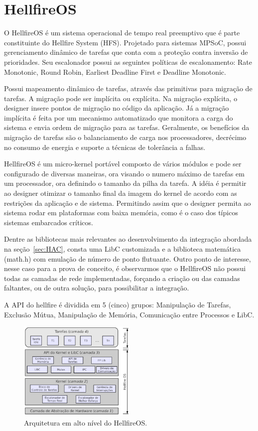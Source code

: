 \section{HellfireOS}
\label{sec:HellfireOS}
O HellfireOS é um sistema operacional de tempo real preemptivo que é parte constituinte
do Hellfire System (HFS). Projetado para sistemas MPSoC, possui gerenciamento
dinâmico de tarefas que conta com a proteção contra inversão de prioridades. Seu escalonador
possui as seguintes políticas de escalonamento: Rate Monotonic, Round Robin, Earliest Deadline First e
Deadline Monotonic.

Possui mapeamento dinâmico de tarefas, através das primitivas para migração de tarefas. A migração pode
ser implícita ou explícita. Na migração explícita, o designer insere pontos de migração no código
da aplicação. Já a migração implícita é feita por um mecanismo automatizado que monitora a carga do
sistema e envia ordem de migração para as tarefas. Geralmente, os benefícios da migração de tarefas são
o balanciamento de carga nos processadores, decrécimo no consumo de energia e suporte a técnicas de
tolerância a falhas.

HellfireOS é um micro-kernel portável composto de vários módulos e pode ser configurado de diversas maneiras,
ora visando o numero máximo de tarefas em um processador, ora definindo o tamanho da pilha da tarefa.
A idéia é permitir ao designer otimizar o tamanho final da imagem do kernel de acordo com as restrições
da aplicação e de sistema. Permitindo assim que o designer permita ao sistema rodar em plataformas com
baixa memória, como é o caso dos típicos sistemas embarcados críticos.

Dentre as bibliotecas mais relevantes ao desenvolvimento da integração abordada na seção~\ref{sec:HAC},
consta uma LibC customizada e a biblioteca matemática (math.h) com emulação de número de ponto
flutuante. Outro ponto de interesse, nesse caso para a prova de conceito, é observarmos
que o HellfireOS não possui todas as camadas de rede implementadas, forçando a criação
ou das camadas faltantes, ou de outra solução, para possibilitar a integração.

A API do hellfire é dividida em 5 (cinco) grupos: Manipulação de Tarefas, Exclusão Mútua,
Manipulação de Memória, Comunicação entre Processos e LibC.

\begin{figure}[H]
	\centering
		\includegraphics[width=0.5\textwidth]{fig/HellfireArch.png}
	\caption{Arquitetura em alto nível do HellfireOS.}
\end{figure}

